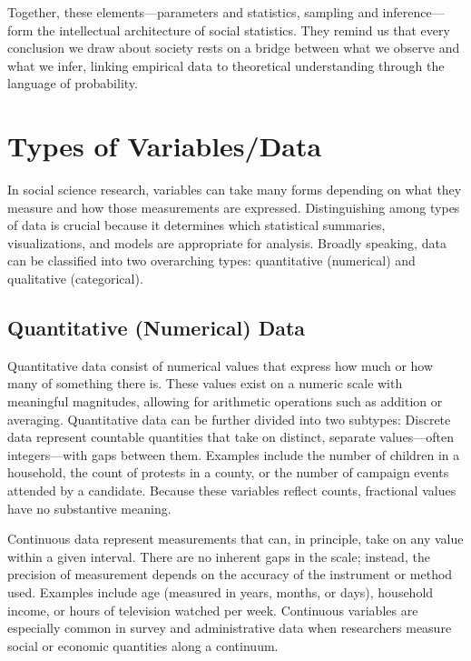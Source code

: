 \documentclass[
  letterpaper,
  DIV=11,
  numbers=noendperiod]{scrreprt}
\begin{document}
Together, these elements---parameters and statistics, sampling and
inference---form the intellectual architecture of social statistics.
They remind us that every conclusion we draw about society rests on a
bridge between what we observe and what we infer, linking empirical data
to theoretical understanding through the language of probability.

\section{Types of Variables/Data}\label{types-of-variablesdata}

In social science research, variables can take many forms depending on
what they measure and how those measurements are expressed.
Distinguishing among types of data is crucial because it determines
which statistical summaries, visualizations, and models are appropriate
for analysis. Broadly speaking, data can be classified into two
overarching types: quantitative (numerical) and qualitative
(categorical).

\subsection{Quantitative (Numerical)
Data}\label{quantitative-numerical-data}

Quantitative data consist of numerical values that express how much or
how many of something there is. These values exist on a numeric scale
with meaningful magnitudes, allowing for arithmetic operations such as
addition or averaging. Quantitative data can be further divided into two
subtypes: Discrete data represent countable quantities that take on
distinct, separate values---often integers---with gaps between them.
Examples include the number of children in a household, the count of
protests in a county, or the number of campaign events attended by a
candidate. Because these variables reflect counts, fractional values
have no substantive meaning.

Continuous data represent measurements that can, in principle, take on
any value within a given interval. There are no inherent gaps in the
scale; instead, the precision of measurement depends on the accuracy of
the instrument or method used. Examples include age (measured in years,
months, or days), household income, or hours of television watched per
week. Continuous variables are especially common in survey and
administrative data when researchers measure social or economic
quantities along a continuum.
\end{document}
